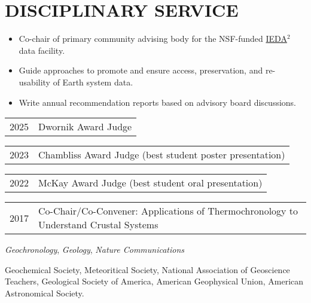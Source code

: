 \section{DISCIPLINARY SERVICE}

\begin{itemize}
	\item Co-chair of primary community advising body for the NSF-funded \href{https://www.iedadata.org/}{IEDA$^2$} data facility.
	\item Guide approaches to promote and ensure access, preservation, and re-usability of Earth system data.
	\item Write annual recommendation reports based on advisory board discussions. 
\end{itemize}




\begin{tabular}{ll} 
	2025 & Dwornik Award Judge
\end{tabular}

\begin{tabular}{ll} 
	2023 & Chambliss Award Judge (best student poster presentation)
\end{tabular}

\begin{tabular}{ll} 
	2022 & 	McKay Award Judge (best student oral presentation)
\end{tabular}

\begin{tabular}{ll} 
	2017 & 	Co-Chair/Co-Convener: Applications of Thermochronology to Understand Crustal Systems
\end{tabular}

\textit{Geochronology}, \textit{Geology}, \textit{Nature Communications}

Geochemical Society, Meteoritical Society, National Association of Geoscience Teachers, Geological Society of America, American Geophysical Union, American Astronomical Society.